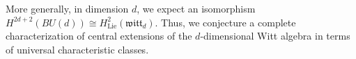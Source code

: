 \documentclass[11pt]{amsart}
\newtheorem{thm}{Theorem}[section]
\theoremstyle{definition}
\theoremstyle{remark}
\numberwithin{equation}{section}
\newcommand{\bu}{\bullet}
\newcommand{\op}{\operatorname}
\newcommand{\C}{\mathbb{C}}
\newcommand{\dbar}{\overline{\partial}}
\newcommand{\cO}{\mathcal{O}}
\begin{document}
%
%

More generally, in dimension $d$, we expect an isomorphism $H^{2d+2}(BU(d)) \cong
H^2_{\op{Lie}} (\mathfrak{witt}_d)$.
Thus, we conjecture a complete characterization of central extensions of the $d$-dimensional Witt
algebra in terms of universal characteristic classes.
\end{document}
